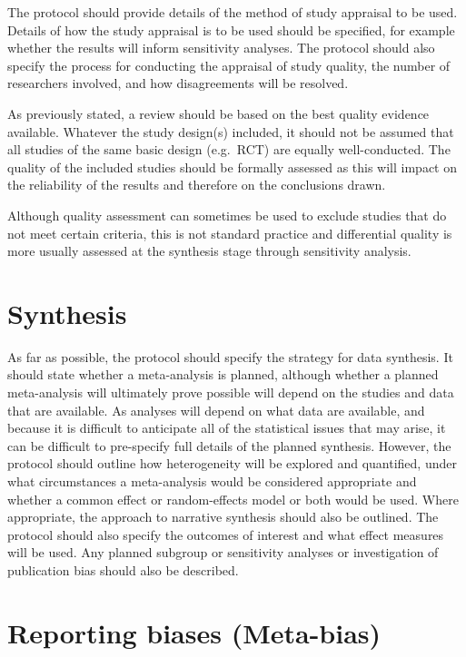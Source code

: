 \documentclass[
  11pt,
  a4paper,
  DIV=11,
  numbers=noendperiod]{scrreprt}
\begin{document}
The protocol should provide details of the method of study appraisal to
be used. Details of how the study appraisal is to be used should be
specified, for example whether the results will inform sensitivity
analyses. The protocol should also specify the process for conducting
the appraisal of study quality, the number of researchers involved, and
how disagreements will be resolved.

As previously stated, a review should be based on the best quality
evidence available. Whatever the study design(s) included, it should not
be assumed that all studies of the same basic design (e.g.~RCT) are
equally well-conducted. The quality of the included studies should be
formally assessed as this will impact on the reliability of the results
and therefore on the conclusions drawn.

Although quality assessment can sometimes be used to exclude studies
that do not meet certain criteria, this is not standard practice and
differential quality is more usually assessed at the synthesis stage
through sensitivity analysis.

\section{Synthesis}\label{synthesis}

As far as possible, the protocol should specify the strategy for data
synthesis. It should state whether a meta-analysis is planned, although
whether a planned meta-analysis will ultimately prove possible will
depend on the studies and data that are available. As analyses will
depend on what data are available, and because it is difficult to
anticipate all of the statistical issues that may arise, it can be
difficult to pre-specify full details of the planned synthesis. However,
the protocol should outline how heterogeneity will be explored and
quantified, under what circumstances a meta-analysis would be considered
appropriate and whether a common effect or random-effects model or both
would be used. Where appropriate, the approach to narrative synthesis
should also be outlined. The protocol should also specify the outcomes
of interest and what effect measures will be used. Any planned subgroup
or sensitivity analyses or investigation of publication bias should also
be described.

\section{Reporting biases (Meta-bias)}\label{reporting-biases-meta-bias}
\end{document}
